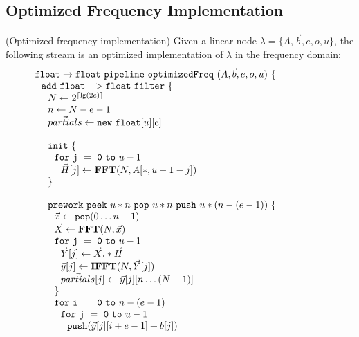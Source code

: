 \subsection{Optimized Frequency Implementation}

\begin{transformation} (Optimized frequency implementation)
Given a linear node $\lambda = \{A, {\vec b}, e, o, u\}$, the
following stream is an optimized implementation of $\lambda$ in the
frequency domain: \\
\begin{equation} \nonumber
  \begin{array}{ll}

    {\tt float \rightarrow float}~{\tt pipeline~optimizedFreq~}(A, {\vec b}, e, o, u){\tt ~\{} & \hspace{40pt}\\
    ~~{\tt add~float->float~filter~\{}\\
    ~~~~N \leftarrow 2^{\lceil \lg(2e) \rceil} \\
    ~~~~n \leftarrow N-e-1 \\
    ~~~~\vec{partials} \leftarrow {\tt new~float}[u][e] \\
    \\
    ~~~~{\tt init}~{\tt \{} \\
    ~~~~~~{\tt for~j~=~0~to~}u-1\\
    ~~~~~~~~\vec{H}[j] \leftarrow \mathbf{FFT}(N,A[*,u-1-j]) \\
    ~~~~{\tt \}} \\
    \\
    ~~~~{\tt prework}~{\tt peek}~u*n~{\tt pop}~u*n~{\tt push}~u*(n-(e-1))~{\tt \{}\\
    ~~~~~~\vec{x} \leftarrow {\tt pop}(0 \dots n-1) \\
    ~~~~~~\vec{X} \leftarrow \mathbf{FFT} (N, \vec{x}) \\
    ~~~~~~{\tt for~j~=~0~to~}u-1\\
    ~~~~~~~~\vec{Y}[j] \leftarrow \vec{X} .* \vec{H} \\
    ~~~~~~~~\vec{y}[j] \leftarrow \mathbf{IFFT}(N, \vec{Y}[j]) \\
    ~~~~~~~~\vec{partials}[j] \leftarrow \vec{y}[j][n \dots (N-1)]\\
    ~~~~~~{\tt \}} \\
    ~~~~~~{\tt for~i~=~0~to~}n-(e-1)\\
    ~~~~~~~~{\tt for~j~=~0~to~}u-1\\
    ~~~~~~~~~~{\tt push}(\vec{y}[j][i+e-1] + b[j]) \\

\end{array}
\end{equation}
\end{transformation}

